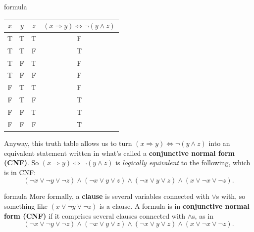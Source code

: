 \documentclass{beamer}
\begin{document}
\begin{frame}{formula}
\begin{center}
\begin{tabular}{|c|c|c|c|}
\hline
$x$ & $y$ & $z$ & $(x \Rightarrow y) \Leftrightarrow \neg (y \land z)$\\
\hline
T & T & T & F\\
\hline
T & T & F & T\\
\hline
T & F & T & F\\
\hline
T & F & F & F\\
\hline
F & T & T & F\\
\hline
F & T & F & T\\
\hline
F & F & T & T\\
\hline
F & F & F & T\\
\hline
\end{tabular}
\end{center}
Anyway, this truth table allows us to turn $(x \Rightarrow y) \Leftrightarrow \neg (y \land z)$ into an equivalent statement written in what's called a \textbf{conjunctive normal form (CNF)}. So $(x \Rightarrow y) \Leftrightarrow \neg (y \land z)$ is \textit{logically equivalent} to the following, which is in CNF:
$$(\neg x \lor \neg y \lor \neg z) \land (\neg x \lor y \lor z) \land (\neg x \lor y \lor z) \land (x \lor \neg x \lor \neg z).$$
\end{frame}

\begin{frame}{formula}
More formally, a \textbf{clause} is several variables connected with $\lor$s with, so something like $(x \lor \neg y \lor \neg z)$ is a clause. A formula is in \textbf{conjunctive normal form (CNF)} if it comprises several clauses connected with $\land$s, as in 
$$(\neg x \lor \neg y \lor \neg z) \land (\neg x \lor y \lor z) \land (\neg x \lor y \lor z) \land (x \lor \neg x \lor \neg z).$$
\end{frame}
\end{document}
